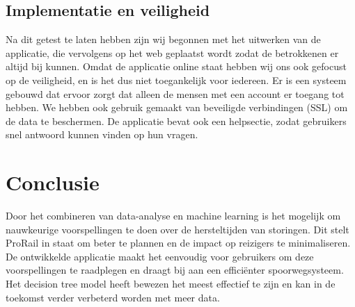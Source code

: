 \documentclass{article}
\begin{document}
\subsection{Implementatie en veiligheid}
Na dit getest te laten hebben zijn wij begonnen met het uitwerken van de applicatie, die vervolgens op het web geplaatst wordt zodat de betrokkenen er altijd bij kunnen. Omdat de applicatie online staat hebben wij ons ook gefocust op de veiligheid, en is het dus niet toegankelijk voor iedereen. Er is een systeem gebouwd dat ervoor zorgt dat alleen de mensen met een account er toegang tot hebben. We hebben ook gebruik gemaakt van beveiligde verbindingen (SSL) om de data te beschermen. De applicatie bevat ook een helpsectie, zodat gebruikers snel antwoord kunnen vinden op hun vragen.

\newpage
\section{Conclusie}
Door het combineren van data-analyse en machine learning is het mogelijk om nauwkeurige voorspellingen te doen over de hersteltijden van storingen. Dit stelt ProRail in staat om beter te plannen en de impact op reizigers te minimaliseren. De ontwikkelde applicatie maakt het eenvoudig voor gebruikers om deze voorspellingen te raadplegen en draagt bij aan een efficiënter spoorwegsysteem. Het decision tree model heeft bewezen het meest effectief te zijn en kan in de toekomst verder verbeterd worden met meer data.
\end{document}

